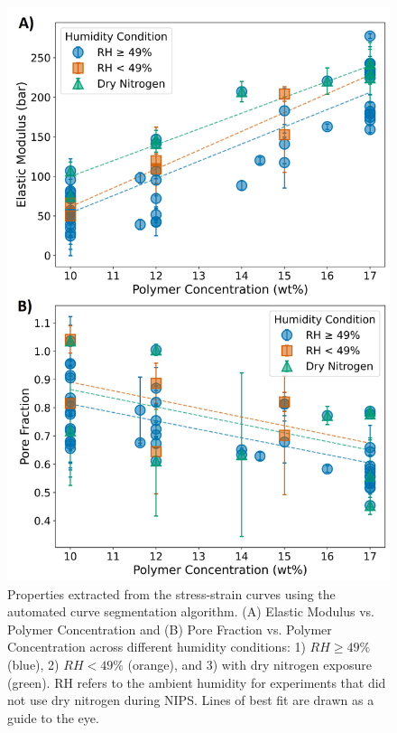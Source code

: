\documentclass[preprint,12pt,times]{elsarticle}
\begin{document}
\begin{figure}[!ht]
\centering
\includegraphics[width=\linewidth]{modulus_and_pore_fraction_V.jpg}
\caption{Properties extracted from the stress-strain curves using the automated curve segmentation algorithm. (A) Elastic Modulus vs. Polymer Concentration and (B) Pore Fraction vs. Polymer Concentration across different humidity conditions: 1) $RH \geq 49\%$ (blue), 2) $RH < 49\%$ (orange), and 3) with dry nitrogen exposure (green). RH refers to the ambient humidity for experiments that did not use dry nitrogen during NIPS. Lines of best fit are drawn as a guide to the eye.}
\label{modulus_and_pore_fraction_V.jpg}
\end{figure}
\end{document}
